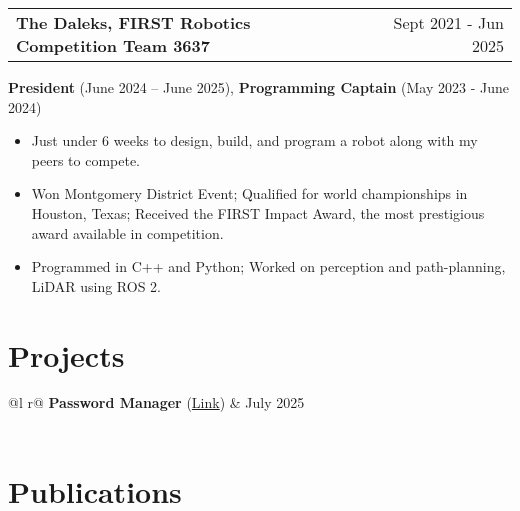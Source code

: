 \documentclass[a4paper,12pt]{article}
\makeatletter
\newenvironment{joblong}[3]
    {
    \begin{tabularx}{\linewidth}{@{}l X r@{}}
    \textbf{#1} & \hfill &  #2 \\[3.5pt]
    \end{tabularx}
    #3 \\[3.5pt]
    \begin{minipage}[t]{\linewidth}
    \begin{itemize}[nosep,after=\strut, leftmargin=1em, itemsep=2pt,label=--]
    }
    {
    \end{itemize}
    \end{minipage}    
    }
\makeatother
\begin{document}
\begin{joblong}{The Daleks, FIRST Robotics Competition Team 3637}{Sept 2021 - Jun 2025}{\textbf{President} (June 2024 – June 2025), \textbf{Programming Captain} (May 2023 - June 2024)}
\item Just under 6 weeks to design, build, and program a robot along with my peers to compete.
\item Won Montgomery District Event; Qualified for world championships in Houston, Texas; Received the FIRST Impact Award, the most prestigious award available in competition.
\item Programmed in C++ and Python; Worked on perception and path-planning, LiDAR using ROS 2.
\end{joblong}
  
\section{Projects}

\begin{tabularx}{\linewidth}{ @{}l r@{} }
\textbf{Password Manager} (\href{https://github.com/BarrelDev/password-manager}{Link}) & July 2025\\[3.75pt]
  \\
\end{tabularx}

\section{Publications}
\begin{refsection}
\nocite{*}
\printbibliography[heading=none]
\end{refsection}



\vfill
{}
\end{document}
